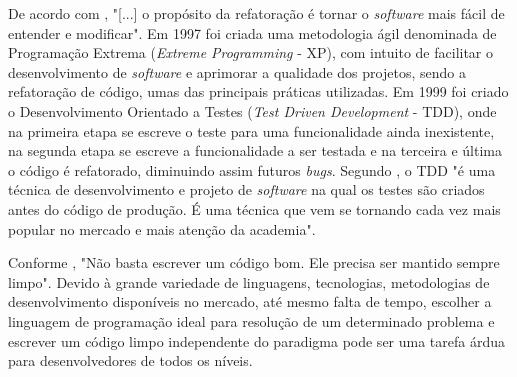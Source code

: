 De acordo com , "[...] o propósito da refatoração é tornar o \textit{software} mais fácil de entender e modificar". Em 1997 foi criada uma metodologia ágil denominada de Programação Extrema (\textit{Extreme Programming} - XP), com intuito de facilitar o desenvolvimento de \textit{software} e aprimorar a qualidade dos projetos, sendo a refatoração de código, umas das principais práticas utilizadas.
Em 1999 foi criado o Desenvolvimento Orientado a Testes (\textit{Test Driven Development} - TDD), onde na primeira etapa se escreve o teste para uma funcionalidade ainda inexistente, na segunda etapa se escreve a funcionalidade a ser testada e na terceira e última o código é refatorado, diminuindo assim futuros \textit{bugs}. Segundo , o TDD "é uma técnica de desenvolvimento e projeto de \textit{software} na qual os testes são criados antes do código de produção. É uma técnica que vem se tornando cada vez mais popular no mercado e mais atenção da academia".

Conforme , "Não basta escrever um código bom. Ele precisa ser mantido sempre limpo". Devido à grande variedade de linguagens, tecnologias, metodologias de desenvolvimento disponíveis no mercado, até mesmo falta de tempo, escolher a linguagem de programação ideal para resolução de um determinado problema e escrever um código limpo independente do paradigma pode ser uma tarefa árdua para desenvolvedores de todos os níveis.



